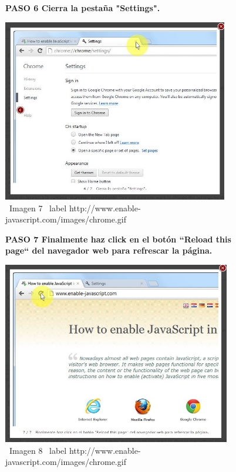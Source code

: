 \documentclass[11pt]{article} %
\begin{document}
\begin{figure}
\begin{center}
\begin{center}

\bf PASO 6 Cierra la pestaña "Settings".
\end{center}

\includegraphics[height=8cm, width=8 cm] {imagenes/chrome 06.JPG}
\newline
\newline
\ Imagen 7
\ label { http://www.enable-javascript.com/images/chrome.gif }


\end{center}
\end{figure}


\begin{figure}
\begin{center}
\begin{center}
\bf PASO 7
Finalmente haz click en el botón ``Reload this page`` del navegador web para refrescar la página.
\newline
\end{center}

\includegraphics[height=8cm, width=8 cm] {imagenes/chrome 07.JPG}
\newline
\ Imagen 8
\ label { http://www.enable-javascript.com/images/chrome.gif }
\end{center}
\end{figure}
\end{document}
